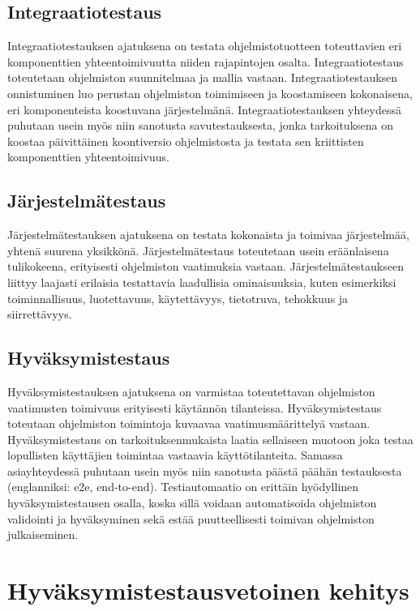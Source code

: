   \subsection{Integraatiotestaus}

  Integraatiotestauksen ajatuksena on testata ohjelmistotuotteen toteuttavien eri komponenttien yhteentoimivuutta niiden rajapintojen osalta.
  Integraatiotestaus toteutetaan ohjelmiston suunnitelmaa ja mallia vastaan.
  Integraatiotestauksen onnistuminen luo perustan ohjelmiston toimimiseen ja koostamiseen kokonaisena, eri komponenteista koostuvana järjestelmänä.
  Integraatiotestauksen yhteydessä puhutaan usein myös niin sanotusta savutestauksesta, jonka tarkoituksena on koostaa päivittäinen koontiversio ohjelmistosta ja testata sen kriittisten komponenttien yhteentoimivuus.

  \subsection{Järjestelmätestaus}

  Järjestelmätestauksen ajatuksena on testata kokonaista ja toimivaa järjestelmää, yhtenä suurena yksikkönä.
  Järjestelmätestaus toteutetaan usein eräänlaisena tulikokeena, erityisesti ohjelmiston vaatimuksia vastaan.
  Järjestelmätestaukseen liittyy laajasti erilaisia testattavia laadullisia ominaisuuksia, kuten esimerkiksi toiminnallisuus, luotettavuus, käytettävyys, tietotruva, tehokkuus ja siirrettävyys.

  \subsection{Hyväksymistestaus}

  Hyväksymistestauksen ajatuksena on varmistaa toteutettavan ohjelmiston vaatimusten toimivuus erityisesti käytännön tilanteissa.
  Hyväksymistestaus toteutaan ohjelmiston toimintoja kuvaavaa vaatimusmäärittelyä vastaan.
  Hyväksymistestaus on tarkoituksenmukaista laatia sellaiseen muotoon joka testaa lopullisten käyttäjien toimintaa vastaavia käyttötilanteita.
  Samassa asiayhteydessä puhutaan usein myös niin sanotusta päästä päähän testauksesta (englanniksi: e2e, end-to-end).
  Testiautomaatio on erittäin hyödyllinen hyväksymistestausen osalla, koska sillä voidaan automatisoida ohjelmiston validointi ja hyväksyminen sekä estää puutteellisesti toimivan ohjelmiston julkaiseminen.

\section{Hyväksymistestausvetoinen kehitys}

